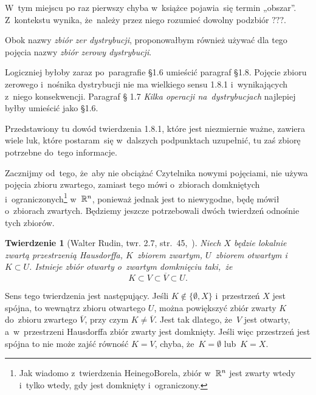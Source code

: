 \documentclass[a4paper,11pt]{article}
\newtheorem{twr}{Twierdzenie} %
\begin{document}
\start {} W~tym miejscu po raz pierwszy chyba w~książce
pojawia~się termin „obszar”. Z~kontekstu wynika, że~należy przez
niego rozumieć dowolny podzbiór $???$.

\vspace{\spaceFour}



\start {} Obok nazwy \textit{zbiór zer dystrybucji}, proponowałbym
również używać dla tego pojęcia nazwy \textit{zbiór zerowy dystrybucji}.

\vspace{\spaceFour}


\start {} Logiczniej byłoby zaraz po~paragrafie \S 1.6 umieścić
paragraf \S 1.8. Pojęcie zbioru zerowego i~nośnika dystrybucji nie ma
wielkiego sensu 1.8.1 i~wynikających z~niego konsekwencji. Paragraf \S
1.7 \textit{Kilka operacji na~dystrybucjach} najlepiej byłby umieścić
jako \S 1.6.

\vspace{\spaceFour}



\start {} Przedstawiony tu dowód twierdzenia 1.8.1, które
jest niezmiernie ważne, zawiera wiele luk, które postaram~się
w~dalszych podpunktach uzupełnić, tu zaś zbiorę potrzebne do~tego
informacje.

Zacznijmy od~tego, że~aby nie obciążać Czytelnika nowymi pojęciami,
nie używa pojęcia zbioru zwartego, zamiast tego mówi o~zbiorach
domkniętych i~ograniczonych\footnote{Jak wiadomo z~twierdzenia
  Heinego\dywiz Borela, zbiór w~$\mathbb{R}^{ n }$ jest zwarty wtedy i~tylko
  wtedy, gdy jest domknięty i~ograniczony.} w~$\mathbb{R}^{ n }$, ponieważ jednak jest to
niewygodne, będę mówił o~zbiorach zwartych. Będziemy jeszcze
potrzebowali dwóch twierdzeń odnośnie tych zbiorów.

\begin{twr}[Walter Rudin, twr. 2.7,
  str.~45,~\cite{RudinAnalizaRzeczywistaIZespolona1998}]
  \label{thm:Zem-s01-01}
  Niech $X$ będzie lokalnie zwartą przestrzenią Hausdorffa,
  $K$~zbiorem zwartym, $U$~zbiorem otwartym i~$K \subset U$. Istnieje
  zbiór otwarty o~zwartym domknięciu taki,~że
  \begin{equation}
    \label{eq:Zem-s01-04}
    K \subset V \subset \overline{ V } \subset U.
  \end{equation}
\end{twr}
Sens tego twierdzenia jest następujący. Jeśli $K \notin \{ \emptyset, X \}$
i~przestrzeń $X$ jest spójna, to wewnątrz zbioru otwartego $U$, można
powiększyć zbiór zwarty $K$ do~zbioru zwartego $\overline{ V }$, przy czym
$K \neq \overline{ V }$. Jest tak dlatego, że~$V$ jest otwarty,
a~w~przestrzeni Hausdorffa zbiór zwarty jest domknięty. Jeśli więc
przestrzeń jest spójna to nie może zajść równość $K = V$, chyba,
że~$K = \emptyset$ lub~$K = X$.
\end{document}
